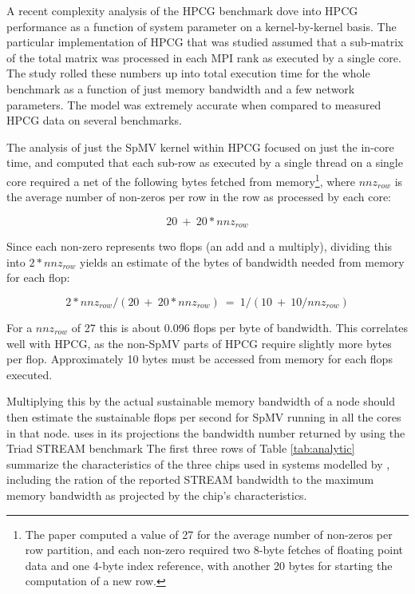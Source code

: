 A recent complexity analysis of the HPCG benchmark \cite{techbib:marjanovic2014performance} dove into HPCG performance as a function of system parameter on a kernel-by-kernel basis. The particular implementation of HPCG that was studied assumed that a sub-matrix of the total matrix was processed in each MPI rank as executed by a single core. The study rolled these numbers up into total execution time for the whole benchmark as a function of just memory bandwidth and a few network parameters. The model was extremely accurate when compared to measured HPCG data on several benchmarks.

The analysis of just the SpMV kernel within HPCG focused on just the in-core time, and computed that each sub-row as executed by a single thread on a single core required a net of the following bytes fetched from memory\footnote{The paper computed a value of 27 for the average number of non-zeros per row partition, and each non-zero required two 8-byte fetches of floating point data and one 4-byte index reference, with another 20 bytes for starting the computation of a new row.}, where $nnz_{row}$ is the average number of non-zeros per row in the row as processed by each core:

\begin{equation}\label{eqtn:BytesPerRow}
20~+~20*nnz_{row}
\end{equation}

Since each non-zero represents two flops (an add and a multiply), dividing this into $2*nnz_{row}$ yields an estimate of the bytes of bandwidth needed from memory for each flop:

\begin{equation}\label{eqtn:BytesPerFlop}
2*nnz_{row}/(20~+~20*nnz_{row}) ~=~1/(10~+~10/nnz_{row})
\end{equation}

For a $nnz_{row}$ of 27 this is about 0.096 flops per byte of bandwidth. This correlates well with HPCG, as the non-SpMV parts of HPCG require slightly more bytes per flop. Approximately 10 bytes must be accessed from memory for each flops executed.

Multiplying this by the actual sustainable memory bandwidth of a node should then estimate the sustainable flops per second for SpMV running in all the cores in that node. \cite{techbib:marjanovic2014performance} uses in its projections the bandwidth number returned by using the Triad STREAM benchmark
The first three rows of Table \ref{tab:analytic} summarize the characteristics of the three chips used in systems modelled by \cite{techbib:marjanovic2014performance}, including the ration of the reported STREAM bandwidth to the maximum memory bandwidth as projected by the chip's characteristics.


